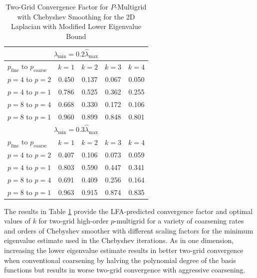 \begin{table}[ht!]
\begin{center}
\begin{tabular}{l c c c c}
  \toprule
  \multicolumn{5}{c}{$\lambda_{\min} = 0.2 \hat{\lambda}_{\max}$} \\
  \toprule
  $p_{\text{fine}}$ to $p_{\text{coarse}}$  &  $k = 1$   &  $k = 2$   &  $k = 3$   &  $k = 4$   \\
  \toprule
  $p = 4$ to $p = 2$   &  0.450  &  0.137  &  0.067  &  0.050  \\
  $p = 4$ to $p = 1$   &  0.786  &  0.525  &  0.362  &  0.255  \\
  \midrule
  $p = 8$ to $p = 4$   &  0.668  &  0.330  &  0.172  &  0.106  \\
  $p = 8$ to $p = 1$   &  0.960  &  0.899  &  0.848  &  0.801  \\
  \toprule
  \multicolumn{5}{c}{$\lambda_{\min} = 0.3 \hat{\lambda}_{\max}$} \\
  \toprule
  $p_{\text{fine}}$ to $p_{\text{coarse}}$  &  $k = 1$   &  $k = 2$   &  $k = 3$   &  $k = 4$   \\
  \toprule
  $p = 4$ to $p = 2$   &  0.407  &  0.106  &  0.073  &  0.059  \\
  $p = 4$ to $p = 1$   &  0.803  &  0.590  &  0.447  &  0.341  \\
  \midrule
  $p = 8$ to $p = 4$   &  0.691  &  0.409  &  0.256  &  0.164  \\
  $p = 8$ to $p = 1$   &  0.963  &  0.915  &  0.874  &  0.835  \\
  \bottomrule
\end{tabular}
\end{center}
\caption{Two-Grid Convergence Factor for $P$-Multigrid with Chebyshev Smoothing for the 2D Laplacian with Modified Lower Eigenvalue Bound}
\label{table:two_grid_2d_chebyshev_eigenvalues}
\end{table}

The results in Table \ref{table:two_grid_2d_chebyshev_eigenvalues} provide the LFA-predicted convergence factor and optimal values of $k$ for two-grid high-order $p$-multigrid for a variety of coarsening rates and orders of Chebyshev smoother with different scaling factors for the minimum eigenvalue estimate used in the Chebyshev iterations.
As in one dimension, increasing the lower eigenvalue estimate results in better two-grid convergence when conventional coarsening by halving the polynomial degree of the basis functions but results in worse two-grid convergence with aggressive coarsening.

